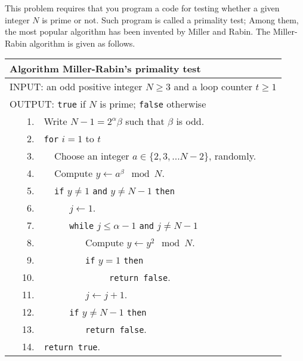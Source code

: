 \documentclass{article}
\begin{document}
This problem requires that you program a code for testing whether a given integer $N$ is prime or not. 
Such program is called a primality test; Among them, the most popular algorithm has been  invented by Miller and Rabin.
The Miller-Rabin algorithm is given as follows.
\begin{table}[h]
\centering
\begin{tabular}{lrlllll}\hline
\multicolumn{7}{l}{\textsf{Algorithm} Miller-Rabin's primality test} \\ \hline
\multicolumn{7}{l}{INPUT: an odd positive integer $N\geq 3$ and a loop counter $t\geq 1$}\\
\multicolumn{7}{l}{OUTPUT: \texttt{true} if $N$ is prime; \texttt{false} otherwise} \\ 
&1. & \multicolumn{5}{l}{Write $N-1=2^\alpha\beta$ such that $\beta$ is odd.}\\
& 2. & \multicolumn{5}{l}{\texttt{for} $i=1$ to $t$}\\
&  3. &  & \multicolumn{4}{l}{Choose an integer $a\in\{2,3,\ldots N-2\}$, randomly.}\\
&  4. &  & \multicolumn{4}{l}{Compute $y\gets a^\beta\mod N$.}\\
& 5. &  & \multicolumn{4}{l}{\texttt{if} $y\neq 1$ \texttt{and} $y\neq N-1$ \texttt{then}}\\
& 6.  &  &  & \multicolumn{3}{l}{$j\gets 1$.}\\
&  7.  &  & & \multicolumn{3}{l}{\texttt{while} $j\leq \alpha-1$ \texttt{and} $j\neq N-1$}\\
&  8. &  &  &  & \multicolumn{2}{l}{Compute $y\gets y^2\mod N$.}\\
&  9. &  &  &  & \multicolumn{2}{l}{\texttt{if} $y=1$ \texttt{then}} \\
& 10. & & & & & \texttt{return false}.\\
&  11. &  &  &  & \multicolumn{2}{l}{$j\gets j+1$.}\\
&  12. &  &  &  \multicolumn{3}{l}{\texttt{if} $y\neq N-1$ \texttt{then}}\\
&  13. &  &  &  & \multicolumn{2}{l}{\texttt{return false}.}\\
& 14. & \multicolumn{5}{l}{\texttt{return true}.}\\ \hline
\end{tabular}
\end{table}
\end{document}
